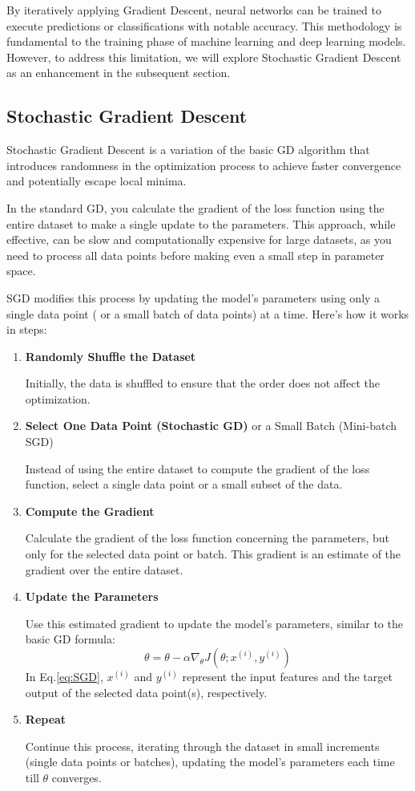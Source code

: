 \documentclass[oneside]{article}
\begin{document}
By iteratively applying Gradient Descent, neural networks can be trained to execute predictions or classifications with notable accuracy. This methodology is fundamental to the training phase of machine learning and deep learning models. However, to address this limitation, we will explore Stochastic Gradient Descent as an enhancement in the subsequent section.
\subsection{Stochastic Gradient Descent}
Stochastic Gradient Descent is a variation of the basic GD algorithm that introduces randomness in the optimization process to achieve faster convergence and potentially escape local minima.\par
In the standard GD, you calculate the gradient of the loss function using the entire dataset to make a single update to the parameters. This approach, while effective, can be slow and computationally expensive for large datasets, as you need to process all data points before making even a small step in parameter space.\par
SGD modifies this process by updating the model's parameters using only a single data point ( or a small batch of data points) at a time. Here's how it works in steps:
\begin{enumerate}
    \item \textbf{Randomly Shuffle the Dataset}\par
    Initially, the data is shuffled to ensure that the order does not affect the optimization.
    \item \textbf{Select One Data Point (Stochastic GD)} or a Small Batch (Mini-batch SGD)\par
    Instead of using the entire dataset to compute the gradient of the loss function, select a single data point or a small subset of the data.
    \item \textbf{Compute the Gradient}\par
    Calculate the gradient of the loss function concerning the parameters, but only for the selected data point or batch. This gradient is an estimate of the gradient over the entire dataset.
    \item \textbf{Update the Parameters}\par
    Use this estimated gradient to update the model's parameters, similar to the basic GD formula:
    \begin{equation}
        \theta = \theta - \alpha \nabla_\theta J(\theta; x^{(i)}, y^{(i)})
        \label{eq:SGD}
    \end{equation}
    In Eq.\ref{eq:SGD}, \(x^{(i)}\) and \(y^{(i)}\) represent the input features and the target output of the selected data point(s), respectively.
    \item \textbf{Repeat} \par
    Continue this process, iterating through the dataset in small increments (single data points or batches), updating the model's parameters each time till $\theta$ converges.
\end{enumerate}
\end{document}
